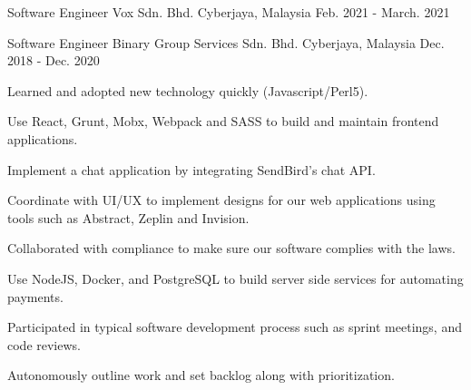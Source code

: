 

\begin{cventries}

  \cventry
    {Software Engineer} %
    {Vox Sdn. Bhd.} %
    {Cyberjaya, Malaysia} %
    {Feb. 2021 - March. 2021} %
    {
      \begin{cvitems} %
        \item {}
        \item {}
        \item {}
        \item {}
        \item {}
        \item {}
      \end{cvitems}
    }
  \cventry
    {Software Engineer} %
    {Binary Group Services Sdn. Bhd.} %
    {Cyberjaya, Malaysia} %
    {Dec. 2018 - Dec. 2020} %
    {
      \begin{cvitems} %
        \item {Learned and adopted new technology quickly (Javascript/Perl5).}
        \item {Use React, Grunt, Mobx, Webpack and SASS to build and maintain frontend applications.}
        \item {Implement a chat application by integrating SendBird's chat API.}
        \item {Coordinate with UI/UX to implement designs for our web applications using tools such as Abstract, Zeplin and Invision.}
        \item {Collaborated with compliance to make sure our software complies with the laws.}
        \item {Use NodeJS, Docker, and PostgreSQL to build server side services for automating payments.}
        \item {Participated in typical software development process such as sprint meetings, and code reviews.}
        \item {Autonomously outline work and set backlog along with prioritization.}

\end{cvitems}}
\end{cventries}
